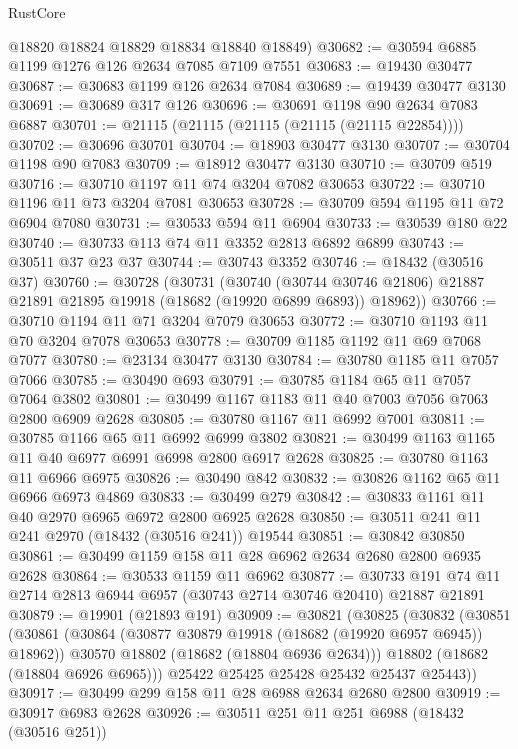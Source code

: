 \begin{lexlean}{RustCore}
\begin{coremodule}
      @18820
      @18824
      @18829
      @18834
      @18840
      @18849)
@30682 := @30594 @6885 @1199 @1276 @126 @2634 @7085 @7109 @7551
@30683 := @19430 @30477
@30687 := @30683 @1199 @126 @2634 @7084
@30689 := @19439 @30477 @3130
@30691 := @30689 @317 @126
@30696 := @30691 @1198 @90 @2634 @7083 @6887
@30701 := @21115 (@21115 (@21115 (@21115 (@21115 @22854))))
@30702 := @30696 @30701
@30704 := @18903 @30477 @3130
@30707 := @30704 @1198 @90 @7083
@30709 := @18912 @30477 @3130
@30710 := @30709 @519
@30716 := @30710 @1197 @11 @74 @3204 @7082 @30653
@30722 := @30710 @1196 @11 @73 @3204 @7081 @30653
@30728 := @30709 @594 @1195 @11 @72 @6904 @7080
@30731 := @30533 @594 @11 @6904
@30733 := @30539 @180 @22
@30740 := @30733 @113 @74 @11 @3352 @2813 @6892 @6899
@30743 := @30511 @37 @23 @37
@30744 := @30743 @3352
@30746 := @18432 (@30516 @37)
@30760 := @30728
    (@30731
      (@30740
        (@30744 @30746 @21806)
        @21887
        @21891
        @21895
        @19918
        (@18682 (@19920 @6899 @6893))
        @18962))
@30766 := @30710 @1194 @11 @71 @3204 @7079 @30653
@30772 := @30710 @1193 @11 @70 @3204 @7078 @30653
@30778 := @30709 @1185 @1192 @11 @69 @7068 @7077
@30780 := @23134 @30477 @3130
@30784 := @30780 @1185 @11 @7057 @7066
@30785 := @30490 @693
@30791 := @30785 @1184 @65 @11 @7057 @7064 @3802
@30801 := @30499 @1167 @1183 @11 @40 @7003 @7056 @7063 @2800 @6909 @2628
@30805 := @30780 @1167 @11 @6992 @7001
@30811 := @30785 @1166 @65 @11 @6992 @6999 @3802
@30821 := @30499 @1163 @1165 @11 @40 @6977 @6991 @6998 @2800 @6917 @2628
@30825 := @30780 @1163 @11 @6966 @6975
@30826 := @30490 @842
@30832 := @30826 @1162 @65 @11 @6966 @6973 @4869
@30833 := @30499 @279
@30842 := @30833 @1161 @11 @40 @2970 @6965 @6972 @2800 @6925 @2628
@30850 := @30511 @241 @11 @241 @2970 (@18432 (@30516 @241)) @19544
@30851 := @30842 @30850
@30861 := @30499 @1159 @158 @11 @28 @6962 @2634 @2680 @2800 @6935 @2628
@30864 := @30533 @1159 @11 @6962
@30877 := @30733 @191 @74 @11 @2714 @2813 @6944 @6957 (@30743 @2714 @30746 @20410) @21887 @21891
@30879 := @19901 (@21893 @191)
@30909 := @30821
    (@30825
      (@30832
        (@30851
          (@30861
            (@30864 (@30877 @30879 @19918 (@18682 (@19920 @6957 @6945)) @18962))
            @30570
            @18802
            (@18682 (@18804 @6936 @2634)))
          @18802
          (@18682 (@18804 @6926 @6965)))
        @25422
        @25425
        @25428
        @25432
        @25437
        @25443))
@30917 := @30499 @299 @158 @11 @28 @6988 @2634 @2680 @2800
@30919 := @30917 @6983 @2628
@30926 := @30511 @251 @11 @251 @6988 (@18432 (@30516 @251))

\end{coremodule}
\end{lexlean}
